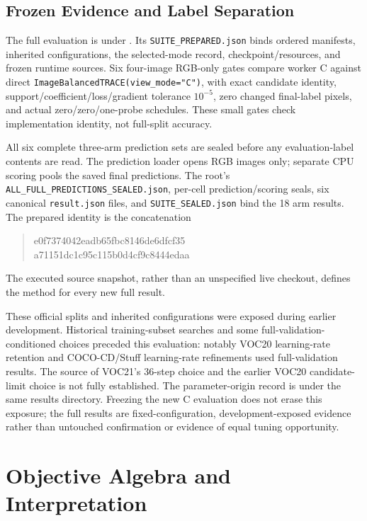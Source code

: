 \subsection{Frozen Evidence and Label Separation}
The full evaluation is  under . Its \texttt{SUITE\_PREPARED.json} binds ordered manifests, inherited configurations, the selected-mode record, checkpoint/resources, and frozen runtime sources. Six four-image RGB-only gates compare worker C against direct \texttt{ImageBalancedTRACE(view\_mode="C")}, with exact candidate identity, support/coefficient/loss/gradient tolerance $10^{-5}$, zero changed final-label pixels, and actual zero/zero/one-probe schedules. These small gates check implementation identity, not full-split accuracy.

All six complete three-arm prediction sets are sealed before any evaluation-label contents are read. The prediction loader opens RGB images only; separate CPU scoring pools the saved final predictions. The root's \texttt{ALL\_FULL\_PREDICTIONS\_SEALED.json}, per-cell prediction/scoring seals, six canonical \texttt{result.json} files, and \texttt{SUITE\_SEALED.json} bind the 18 arm results. The prepared identity is the concatenation
\begin{quote}\small\ttfamily
e0f7374042eadb65fbc8146de6dfcf35\\
a71151dc1c95c115b0d4cf9c8444edaa
\end{quote}
The executed source snapshot, rather than an unspecified live checkout, defines the method for every new full result.

These official splits and inherited configurations were exposed during earlier development. Historical training-subset searches and some full-validation-conditioned choices preceded this evaluation: notably VOC20 learning-rate retention and COCO-CD/Stuff learning-rate refinements used full-validation results. The source of VOC21's 36-step choice and the earlier VOC20 candidate-limit choice is not fully established. The parameter-origin record is  under the same results directory. Freezing the new C evaluation does not erase this exposure; the full results are fixed-configuration, development-exposed evidence rather than untouched confirmation or evidence of equal tuning opportunity.

\section{Objective Algebra and Interpretation}
\label{app:theory}
